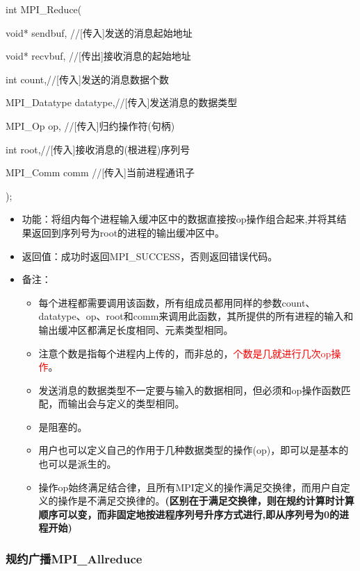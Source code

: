 \documentclass[UTF8]{article}%
\begin{document}
int MPI\_Reduce(
    
    \qquad void* sendbuf, //[传入]发送的消息起始地址
    
    \qquad void* recvbuf, //[传出]接收消息的起始地址

    \qquad int count,//[传入]发送的消息数据个数

    \qquad MPI\_Datatype datatype,//[传入]发送消息的数据类型 

    \qquad MPI\_Op op, //[传入]归约操作符(句柄)

    \qquad int root,//[传入]接收消息的(根进程)序列号

    \qquad MPI\_Comm comm //[传入]当前进程通讯子
    
);

\begin{itemize}
    \item 功能：将组内每个进程输入缓冲区中的数据直接按op操作组合起来,并将其结果返回到序列号为root的进程的输出缓冲区中。
    \item 返回值：成功时返回MPI\_SUCCESS，否则返回错误代码。
    \item 备注：
    
    {
        \begin{itemize}
            \item 每个进程都需要调用该函数，所有组成员都用同样的参数count、datatype、op、root和comm来调用此函数，其所提供的所有进程的输入和输出缓冲区都满足长度相同、元素类型相同。
            \item 注意个数是指每个进程内上传的，而非总的，\textcolor{red}{个数是几就进行几次op操作}。
            \item 发送消息的数据类型不一定要与输入的数据相同，但必须和op操作函数匹配，而输出会与定义的类型相同。
            \item 是阻塞的。
            \item 用户也可以定义自己的作用于几种数据类型的操作(op)，即可以是基本的也可以是派生的。
            \item 操作op始终满足结合律，且所有MPI定义的操作满足交换律，而用户自定义的操作是不满足交换律的。\textbf{(区别在于满足交换律，则在规约计算时计算顺序可以变，而非固定地按进程序列号升序方式进行,即从序列号为0的进程开始)}
        \end{itemize}
    }
\end{itemize}

\subsubsection{规约广播MPI\_Allreduce}
\end{document}
